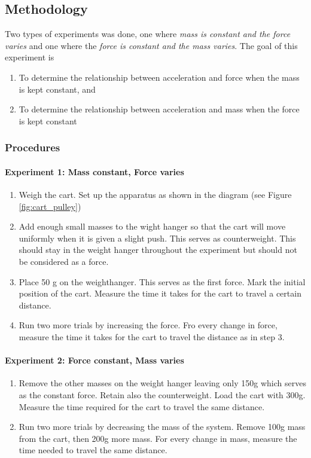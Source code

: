 \documentclass[a4paper,12pt]{article}
\begin{document}
\subsection{Methodology}
Two types of experiments was done, one where \textit{mass is constant and the force varies} and one where the \textit{force is constant and the mass varies}. The goal of this experiment is

\begin{enumerate}
    \item To determine the relationship between acceleration and force when the mass is kept constant, and
    \item To determine the relationship between acceleration and mass when the force is kept constant
\end{enumerate}

\subsubsection{Procedures}

\paragraph{Experiment 1: Mass constant, Force varies}
\begin{enumerate}
    \item Weigh the cart. Set up the apparatus as shown in the diagram (see Figure \ref{fig:cart_pulley})
    \item Add enough small masses to the wight hanger so that the cart will move uniformly when it is given a slight push. This serves as counterweight. This should stay in the weight hanger throughout the experiment but should not be considered as a force.
    \item Place 50 g on the weighthanger. This serves as the first force. Mark the initial position of the cart. Measure the time it takes for the cart to travel a certain distance.
    \item Run two more trials by increasing the force. Fro every change in force, measure the time it takes for the cart to travel the distance as in step 3.
\end{enumerate}

\paragraph{Experiment 2: Force constant, Mass varies}
\begin{enumerate}
    \item Remove the other masses on the weight hanger leaving only 150g which serves as the constant force. Retain also the counterweight. Load the cart with 300g. Measure the time required for the cart to travel the same distance.
    \item Run two more trials by decreasing the mass of the system. Remove 100g mass from the cart, then 200g more mass. For every change in mass, measure the time needed to travel the same distance.
\end{enumerate}
\end{document}
